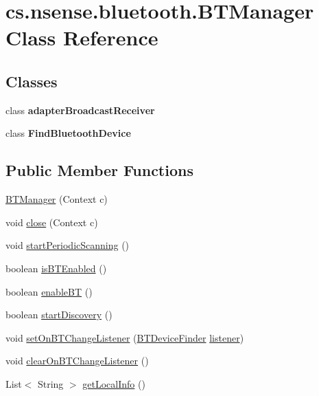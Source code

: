 \hypertarget{classcs_1_1nsense_1_1bluetooth_1_1_b_t_manager}{\section{cs.\-nsense.\-bluetooth.\-B\-T\-Manager Class Reference}
\label{classcs_1_1nsense_1_1bluetooth_1_1_b_t_manager}
}
\subsection*{Classes}
\begin{DoxyCompactItemize}
\item 
class {\bfseries adapter\-Broadcast\-Receiver}
\item 
class {\bfseries Find\-Bluetooth\-Device}
\end{DoxyCompactItemize}
\subsection*{Public Member Functions}
\begin{DoxyCompactItemize}
\item 
\hyperlink{classcs_1_1nsense_1_1bluetooth_1_1_b_t_manager_ab380111972f2f06aa27aff6d4be52dd3}{B\-T\-Manager} (Context c)
\item 
void \hyperlink{classcs_1_1nsense_1_1bluetooth_1_1_b_t_manager_af2d0c28be4b6e0fccb773e206898b4bf}{close} (Context c)
\item 
void \hyperlink{classcs_1_1nsense_1_1bluetooth_1_1_b_t_manager_a0f781d0ed60bacf6c5a9c8f85e066da8}{start\-Periodic\-Scanning} ()
\item 
boolean \hyperlink{classcs_1_1nsense_1_1bluetooth_1_1_b_t_manager_a4cc3716bdc040b85ab4a3e30b5ee1843}{is\-B\-T\-Enabled} ()
\item 
boolean \hyperlink{classcs_1_1nsense_1_1bluetooth_1_1_b_t_manager_a3008f56567884229470a82eb5b4cc4ef}{enable\-B\-T} ()
\item 
boolean \hyperlink{classcs_1_1nsense_1_1bluetooth_1_1_b_t_manager_a96dd8afced3a46fa3e2ca811fc029adc}{start\-Discovery} ()
\item 
void \hyperlink{classcs_1_1nsense_1_1bluetooth_1_1_b_t_manager_a65b70626cf19c80c46b03beb0602afcd}{set\-On\-B\-T\-Change\-Listener} (\hyperlink{interfacecs_1_1nsense_1_1bluetooth_1_1_b_t_device_finder}{B\-T\-Device\-Finder} \hyperlink{classcs_1_1nsense_1_1bluetooth_1_1_b_t_manager_a5467e47729aa7de424544adaa3a89235}{listener})
\item 
void \hyperlink{classcs_1_1nsense_1_1bluetooth_1_1_b_t_manager_ab97531cac0ebb46ce6a771df8b4805d5}{clear\-On\-B\-T\-Change\-Listener} ()
\item 
List$<$ String $>$ \hyperlink{classcs_1_1nsense_1_1bluetooth_1_1_b_t_manager_ac65ddbadec04675d49c785697d082367}{get\-Local\-Info} ()
\end{DoxyCompactItemize}
